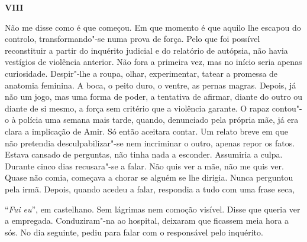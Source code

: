 \vspace*{1.8cm}
\noindent{}\textbf{VIII}

\bigskip

Não me disse como é que começou. Em que momento é que aquilo lhe escapou
do controlo, transformando"-se numa prova de força. Pelo que foi
possível reconstituir a partir do inquérito judicial e do relatório de
autópsia, não havia vestígios de violência anterior. Não fora a primeira
vez, mas no início seria apenas curiosidade. Despir"-lhe a roupa, olhar,
experimentar, tatear a promessa de anatomia feminina. A boca, o peito
duro, o ventre, as pernas magras. Depois, já não um jogo, mas uma forma
de poder, a tentativa de afirmar, diante do outro ou diante de si mesmo,
a força sem critério que a violência garante. O rapaz contou"-o à
polícia uma semana mais tarde, quando, denunciado pela própria mãe, já
era clara a implicação de Amir. Só então aceitara contar. Um relato
breve em que não pretendia desculpabilizar"-se nem incriminar o outro,
apenas repor os fatos. Estava cansado de perguntas, não tinha nada a
esconder. Assumiria a culpa. Durante cinco dias recusara"-se a falar.
Não quis ver a mãe, não me quis ver. Quase não comia, começava a chorar
se alguém se lhe dirigia. Nunca perguntou pela irmã. Depois, quando
acedeu a falar, respondia a tudo com uma frase seca,

``\emph{Fui eu}'',
em castelhano. Sem lágrimas nem comoção visível. Disse que queria ver a
empregada. Conduziram"-na ao hospital, deixaram que ficassem meia hora a
sós. No dia seguinte, pediu para falar com o responsável pelo inquérito.

